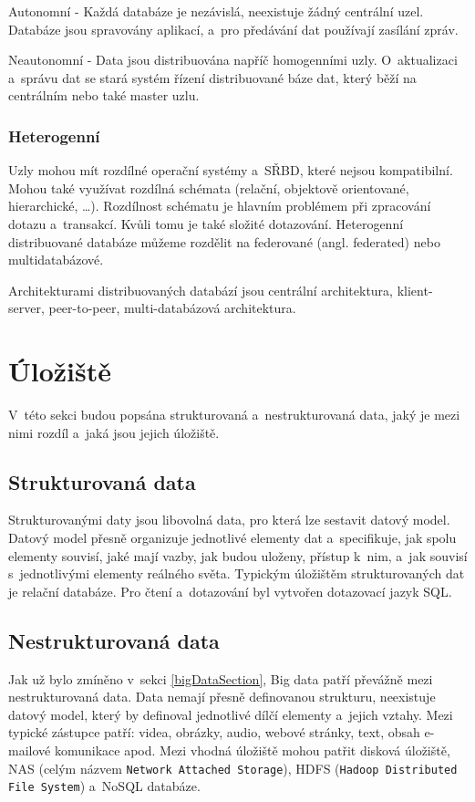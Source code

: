 \vspace{0.5cm}
\noindent Autonomní - Každá databáze je nezávislá, neexistuje žádný centrální uzel. Databáze jsou spravovány aplikací, a~pro předávání dat používají zasílání zpráv.

\vspace{0.5cm}
\noindent Neautonomní - Data jsou distribuována napříč homogenními uzly. O~aktualizaci a~správu dat se stará systém řízení distribuované báze dat, který běží na centrálním nebo také master uzlu.

\subsubsection{Heterogenní}
Uzly mohou mít rozdílné operační systémy a~SŘBD, které nejsou kompatibilní. Mohou také využívat rozdílná schémata (relační, objektově orientované, hierarchické, \ldots). Rozdílnost schématu je hlavním problémem při zpracování dotazu a~transakcí. Kvůli tomu je také složité dotazování. \cite{wikiDBMS} Heterogenní distribuované databáze můžeme rozdělit na federované (angl. federated) nebo multidatabázové.

\vspace{0.5cm}
\noindent Architekturami distribuovaných databází jsou centrální architektura, klient-server, peer-to-peer, multi-databázová architektura.

\section{Úložiště}
V~této sekci budou popsána strukturovaná a~nestrukturovaná data, jaký je mezi nimi rozdíl a~jaká jsou jejich úložiště.

\subsection{Strukturovaná data}
Strukturovanými daty jsou libovolná data, pro která lze sestavit datový model. Datový model přesně organizuje jednotlivé elementy dat a~specifikuje, jak spolu elementy souvisí, jaké mají vazby, jak budou uloženy, přístup k~nim, a~jak souvisí s~jednotlivými elementy reálného světa. \cite{structData} Typickým úložištěm strukturovaných dat je relační databáze. Pro čtení a~dotazování byl vytvořen dotazovací jazyk SQL.

\subsection{Nestrukturovaná data}
Jak už bylo zmíněno v~sekci \ref{bigDataSection}, Big data patří převážně mezi nestrukturovaná data. Data nemají přesně definovanou strukturu, neexistuje datový model, který by definoval jednotlivé dílčí elementy a~jejich vztahy. Mezi typické zástupce patří: videa, obrázky, audio, webové stránky, text, obsah e-mailové komunikace apod. Mezi vhodná úložiště mohou patřit disková úložiště, NAS (celým názvem \texttt{Network Attached Storage}), HDFS (\texttt{Hadoop Distributed File System}) a~NoSQL databáze.

